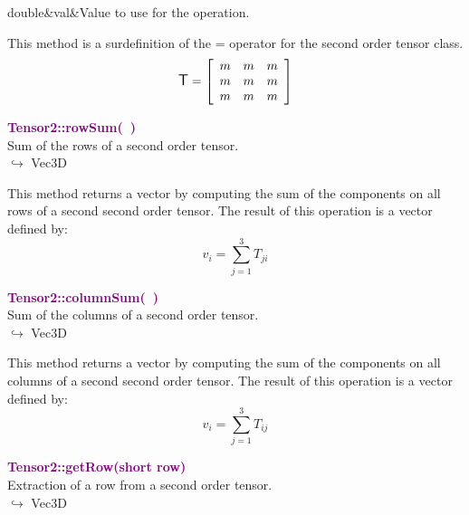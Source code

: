 \begin{tcolorbox}[width=\textwidth,myArgs,tabularx={ll|R},title=Arguments of Tensor2::operator=]
double&val&Value to use for the operation.
\end{tcolorbox}

This method is a surdefinition of the = operator for the second order tensor class.
\begin{equation*}
\mbox{\large\ensuremath{\mathsf{T}}}=\left[\begin{array}{ccc}
m&m&m\\
m&m&m\\
m&m&m
\end{array}\right]
\end{equation*}

\textcolor{purple}{\textbf{Tensor2::rowSum(~)}}\label{Tensor2::rowSum()}\\
Sum of the rows of a second order tensor.\\ \hspace*{10mm}$\hookrightarrow$ Vec3D

This method returns a vector by computing the sum of the components on all rows of a second second order tensor.
The result of this operation is a vector defined by:
\begin{equation*}
v_{i}=\sum_{j=1}^{3} T_{ji}
\end{equation*}

\textcolor{purple}{\textbf{Tensor2::columnSum(~)}}\label{Tensor2::columnSum()}\\
Sum of the columns of a second order tensor.\\ \hspace*{10mm}$\hookrightarrow$ Vec3D

This method returns a vector by computing the sum of the components on all columns of a second second order tensor.
The result of this operation is a vector defined by:
\begin{equation*}
v_{i}=\sum_{j=1}^{3}T_{ij}
\end{equation*}

\textcolor{purple}{\textbf{Tensor2::getRow(short row)}}\label{Tensor2::getRow(short row)}\\
Extraction of a row from a second order tensor.\\ \hspace*{10mm}$\hookrightarrow$ Vec3D

